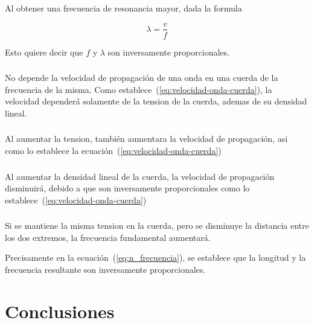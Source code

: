 \documentclass[twocolumn, 12pt]{article}
\begin{document}
\subsubsection{}

Al obtener una frecuencia de resonancia mayor, dada la
formula

\begin{equation*}
    \lambda = \frac{v}{f}
\end{equation*}

Esto quiere decir que $f$ y $\lambda$ son inversamente
proporcionales.

\subsubsection{}

No depende la velocidad de propagación de una onda en una
cuerda de la frecuencia de la misma. Como
establece~(\ref{eq:velocidad-onda-cuerda}), la velocidad
dependerá solamente de la tension de la cuerda, ademas de
su densidad lineal.

\subsubsection{}

Al aumentar la tension, también aumentara la velocidad de
propagación, asi como lo establece la
ecuación~(\ref{eq:velocidad-onda-cuerda})

\subsubsection{}

Al aumentar la densidad lineal de la cuerda, la velocidad
de propagación disminuirá, debido a que son inversamente
proporcionales como lo
establece~(\ref{eq:velocidad-onda-cuerda})

\subsubsection{}

Si se mantiene la misma tension en la cuerda, pero se
disminuye la distancia entre los dos extremos, la
frecuencia fundamental aumentará.

Precisamente en la ecuación~(\ref{eq:n_frecuencia}), se
establece que la longitud y la frecuencia resultante son
inversamente proporcionales.

\section{Conclusiones}

\printbibliography
\end{document}
